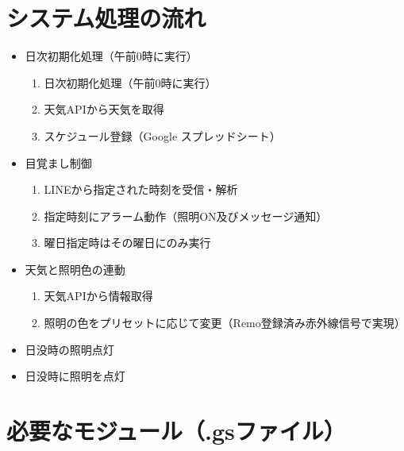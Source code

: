 \documentclass{jarticle}
\begin{document}
\section*{システム処理の流れ}
\begin{itemize}
    \item 日次初期化処理（午前0時に実行）\\
        \begin{enumerate}
            \item 日次初期化処理（午前0時に実行）\\
            \item 天気APIから天気を取得 \\
            \item スケジュール登録（Google スプレッドシート）\\
        \end{enumerate}
    \item 目覚まし制御 \\
        \begin{enumerate}
            \item LINEから指定された時刻を受信・解析\\
            \item 指定時刻にアラーム動作（照明ON及びメッセージ通知）\\
            \item 曜日指定時はその曜日にのみ実行 \\
        \end{enumerate}
    \item  天気と照明色の連動\\
        \begin{enumerate}
            \item 天気APIから情報取得\\
            \item 照明の色をプリセットに応じて変更（Remo登録済み赤外線信号で実現）\\
        \end{enumerate}
    \item 日没時の照明点灯\\
          \item 日没時に照明を点灯\\
\end{itemize}

\section*{必要なモジュール（.gsファイル）}
\end{document}
